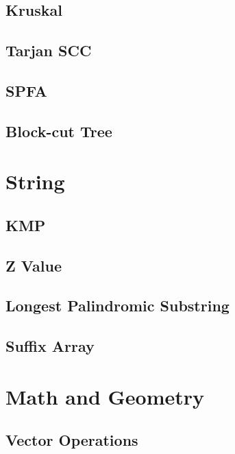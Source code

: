 \documentclass[twocolumn]{article}
\begin{document}
\subsection{Kruskal}


\subsection{Tarjan SCC}


\subsection{SPFA}


\subsection{Block-cut Tree}


\section{String}

\subsection{KMP}


\subsection{Z Value}


\subsection{Longest Palindromic Substring}


\subsection{Suffix Array}


\section{Math and Geometry}

\subsection{Vector Operations}

\end{document}
